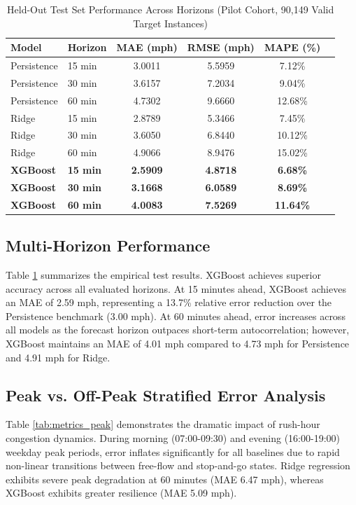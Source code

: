 \documentclass[conference]{IEEEtran}
\begin{document}
\begin{table}[t]
\caption{Held-Out Test Set Performance Across Horizons (Pilot Cohort, 90,149 Valid Target Instances)}
\label{tab:metrics_horizon}
\centering
\begin{tabular}{llcccc}
\toprule
\textbf{Model} & \textbf{Horizon} & \textbf{MAE (mph)} & \textbf{RMSE (mph)} & \textbf{MAPE (\%)} \\
\midrule
Persistence & 15 min & 3.0011 & 5.5959 & 7.12\% \\
Persistence & 30 min & 3.6157 & 7.2034 & 9.04\% \\
Persistence & 60 min & 4.7302 & 9.6660 & 12.68\% \\
\midrule
Ridge       & 15 min & 2.8789 & 5.3466 & 7.45\% \\
Ridge       & 30 min & 3.6050 & 6.8440 & 10.12\% \\
Ridge       & 60 min & 4.9066 & 8.9476 & 15.02\% \\
\midrule
\textbf{XGBoost} & \textbf{15 min} & \textbf{2.5909} & \textbf{4.8718} & \textbf{6.68\%} \\
\textbf{XGBoost} & \textbf{30 min} & \textbf{3.1668} & \textbf{6.0589} & \textbf{8.69\%} \\
\textbf{XGBoost} & \textbf{60 min} & \textbf{4.0083} & \textbf{7.5269} & \textbf{11.64\%} \\
\bottomrule
\end{tabular}
\end{table}

\subsection{Multi-Horizon Performance}
Table \ref{tab:metrics_horizon} summarizes the empirical test results. XGBoost achieves superior accuracy across all evaluated horizons. At 15 minutes ahead, XGBoost achieves an MAE of 2.59 mph, representing a 13.7\% relative error reduction over the Persistence benchmark (3.00 mph). At 60 minutes ahead, error increases across all models as the forecast horizon outpaces short-term autocorrelation; however, XGBoost maintains an MAE of 4.01 mph compared to 4.73 mph for Persistence and 4.91 mph for Ridge.

\subsection{Peak vs. Off-Peak Stratified Error Analysis}
Table \ref{tab:metrics_peak} demonstrates the dramatic impact of rush-hour congestion dynamics. During morning (07:00-09:30) and evening (16:00-19:00) weekday peak periods, error inflates significantly for all baselines due to rapid non-linear transitions between free-flow and stop-and-go states. Ridge regression exhibits severe peak degradation at 60 minutes (MAE 6.47 mph), whereas XGBoost exhibits greater resilience (MAE 5.09 mph).
\end{document}

